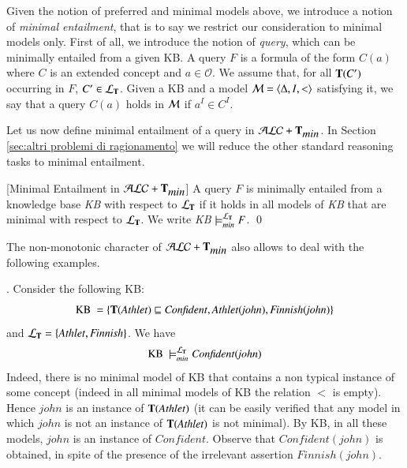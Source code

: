 \documentclass[a4paper, 11pt, oneside]{elsarticle}
\newcommand{\tip}{{\bf T}}
\newcommand{\alctmin}{\mathcal{ALC}+\tip_{\mbox{\em min}}}
\newcommand{\sqset}{\sqsubseteq}
\newcommand{\sx} {\langle}
\newcommand{\dx} {\rangle}
\newcommand{\ellet} {\mathcal{L}_{\bf T}}
\newcommand{\emme} {\begin{mathcal}M\end{mathcal}}
\newenvironment{definition}
{\begin{defi} \rm}{\qed \end{defi}}
\newcounter{posu}
\newtheorem{definition}[posu]{Definition}
\begin{document}
\noindent Given the notion of preferred and minimal models above, we introduce a notion of \emph{minimal entailment}, that is to say we restrict our consideration to minimal models only. First of all,
we introduce the notion of \emph{query}, which can be minimally entailed from a given KB.
A query $F$ is  a formula of the form $C(a)$ where $C$ is an extended concept and $a \in \mathcal{O}$.
We assume that, for all $\tip(C')$ occurring in $F$, $C' \in \ellet$.
Given a KB and a model $\emme=\sx \Delta, I, < \dx$ satisfying it, we say that a query $C(a)$ holds in $\emme$ if $a^I \in C^I$.

Let us now define minimal entailment of a query in $\alctmin$. In
Section \ref{sec:altri problemi di ragionamento} we will reduce
the other  standard reasoning tasks to minimal entailment.

\begin{definition}[Minimal Entailment in $\alctmin$]\label{LogicalConsequenceALCTMIN}
A query $F$  is minimally entailed from a
knowledge base \emph{KB} with respect to ${\ellet}$ if it holds in all
models of \emph{KB} that are minimal with respect to ${\ellet}$. We write \emph{KB}
$\models_{min}^{\ellet} F$.
\end{definition}


\noindent The non-monotonic character of $\alctmin$ also allows to deal with the following examples.

\vspace{0.5cm}


.
Consider the following KB:
$$\mbox{KB} \ = \{ \tip(\mathit{Athlet}) \sqset
\mathit{Confident}, \mathit{Athlet}(\mathit{john}),
\mathit{Finnish}(\mathit{john})\}$$ and ${\ellet}=
\{\mathit{Athlet}, \mathit{Finnish}\}$. We have $$\mbox{KB} \
\models_{min}^{\ellet} \mathit{Confident}(\mathit{john})$$
Indeed, there is no minimal model of KB that contains a non typical instance of some concept (indeed in all minimal models of KB the relation $<$ is empty).
Hence $\mathit{john}$ is an instance of $\tip(\mathit{Athlet})$
(it can be easily verified that any model in which $\mathit{john}$
is not an instance of $\tip(\mathit{Athlet})$ is not minimal).  By
KB, in all these models, $\mathit{john}$ is an instance of
$\mathit{Confident}$. Observe that $\mathit{Confident}(\mathit{john})$ is obtained, in spite of the
presence of the irrelevant assertion
$\mathit{Finnish}(\mathit{john})$.


\vspace{0.35cm}
\end{document}
